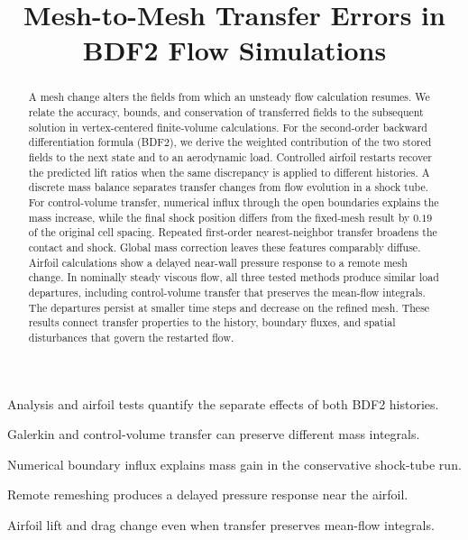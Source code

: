 \documentclass[a4paper,fleqn]{cas-sc}
\begin{document}
\let\WriteBookmarks\relax
\def\floatpagepagefraction{1}
\def\textpagefraction{.001}

\title [mode = title]{Mesh-to-Mesh Transfer Errors in BDF2 Flow Simulations}


\begin{abstract}
A mesh change alters the fields from which an unsteady flow calculation resumes. We relate the accuracy, bounds, and conservation of transferred fields to the subsequent solution in vertex-centered finite-volume calculations. For the second-order backward differentiation formula (BDF2), we derive the weighted contribution of the two stored fields to the next state and to an aerodynamic load. Controlled airfoil restarts recover the predicted lift ratios when the same discrepancy is applied to different histories. A discrete mass balance separates transfer changes from flow evolution in a shock tube. For control-volume transfer, numerical influx through the open boundaries explains the mass increase, while the final shock position differs from the fixed-mesh result by $0.19$ of the original cell spacing. Repeated first-order nearest-neighbor transfer broadens the contact and shock. Global mass correction leaves these features comparably diffuse. Airfoil calculations show a delayed near-wall pressure response to a remote mesh change. In nominally steady viscous flow, all three tested methods produce similar load departures, including control-volume transfer that preserves the mean-flow integrals. The departures persist at smaller time steps and decrease on the refined mesh. These results connect transfer properties to the history, boundary fluxes, and spatial disturbances that govern the restarted flow.
\end{abstract}

\begin{highlights}
\item Analysis and airfoil tests quantify the separate effects of both BDF2 histories.
\item Galerkin and control-volume transfer can preserve different mass integrals.
\item Numerical boundary influx explains mass gain in the conservative shock-tube run.
\item Remote remeshing produces a delayed pressure response near the airfoil.
\item Airfoil lift and drag change even when transfer preserves mean-flow integrals.
\end{highlights}
\end{document}
